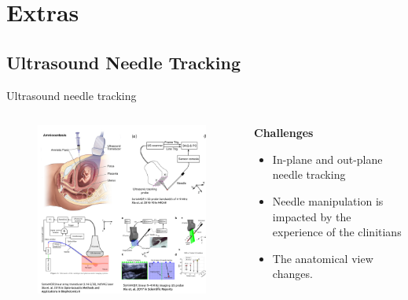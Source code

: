 \section{Extras}


\subsection{Ultrasound Needle Tracking}

{

\begin{frame}{Ultrasound needle tracking}

\begin{columns}

\begin{column}{.6\linewidth}
	\begin{figure}
        \centering
        \includegraphics[scale=0.4]{./figs/unt/versions/drawing-v00}
      \end{figure}
\end{column}

\begin{column}{.4\linewidth}
	\textbf{Challenges}
        \begin{itemize}
	 \item In-plane and out-plane needle tracking
	 \item Needle manipulation is impacted by the experience of the clinitians
	 \item The anatomical view changes.
        \end{itemize}	
\end{column}




\end{columns}
\end{frame}}
